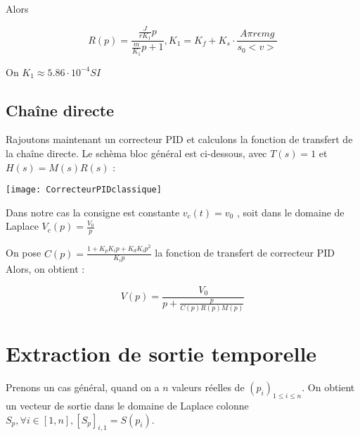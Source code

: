 \documentclass[11pt]{article} %
\begin{document}
Alors

\begin{equation} R(p) = \frac{\frac{J}{r K_1}p}{\frac{m}{K_1}p + 1} , K_1 = K_f + K_s \cdot \frac{A\pi r \epsilon mg}{s_0<v>} \end{equation}

On \begin{math} K_1 \approx 5.86 \cdot 10^{-4} SI \end{math}

\subsection{Chaîne directe}

Rajoutons maintenant un correcteur PID et calculons la fonction de transfert de la chaîne directe. Le schèma bloc général est ci-dessous, avec \begin{math} T(s) = 1 \end{math} et \begin{math} H(s) = M(s)R(s) \end{math} :

\texttt{[image: CorrecteurPIDclassique]} 

Dans notre cas la consigne est constante \begin{math} v_c(t) = v_0 \end{math} , soit dans le domaine de Laplace \begin{math} V_c(p) = \frac{V_0}{p} \end{math}

On pose \begin{math} C(p)  = \frac{1 + K_p K_i p + K_d K_i p^2}{K_i p}\end{math} la fonction de transfert de correcteur PID
Alors, on obtient :

\begin{equation} V(p) = \frac{V_0}{p + \frac{p}{C(p)R(p)M(p)}} \end{equation}


\section{Extraction de sortie temporelle}

Prenons un cas général, quand on a \begin{math} n \end{math} valeurs réelles de \begin{math} (p_i)_{1 \leq i \leq n}\end{math}. On obtient un vecteur de sortie dans le domaine de Laplace colonne \begin{math} S_p ,  \forall i \in [1,n],  [S_p]_{i,1} = S(p_i) \end{math}.
\end{document}
